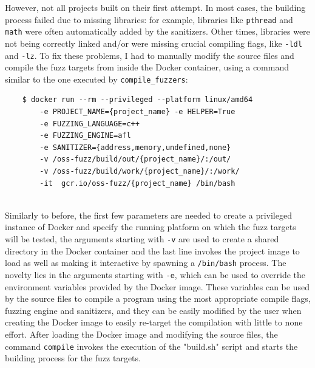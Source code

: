 \newpage
However, not all projects built on their first attempt.
\newline \newline
In most cases, the building process failed due to missing libraries: for example, libraries like \verb|pthread| and \verb|math| were often automatically added by the sanitizers.
\newline
Other times, libraries were not being correctly linked and/or were missing crucial compiling flags, like \verb|-ldl| and \verb|-lz|.
\newline \newline
To fix these problems, I had to manually modify the source files and compile the fuzz targets from inside the Docker container, using a command similar to the one executed by \verb|compile_fuzzers|:
\begin{verbatim}
    $ docker run --rm --privileged --platform linux/amd64 
        -e PROJECT_NAME={project_name} -e HELPER=True 
        -e FUZZING_LANGUAGE=c++ 
        -e FUZZING_ENGINE=afl 
        -e SANITIZER={address,memory,undefined,none} 
        -v /oss-fuzz/build/out/{project_name}/:/out/   
        -v /oss-fuzz/build/work/{project_name}/:/work/
        -it  gcr.io/oss-fuzz/{project_name} /bin/bash
\end{verbatim}
\ \\
Similarly to before, the first few parameters are needed to create a privileged instance of Docker and specify the running platform on which the fuzz targets will be tested, the arguments starting with \verb|-v| are used to create a shared directory in the Docker container and the last line invokes the project image to load as well as making it interactive by spawning a \verb|/bin/bash| process.
\newline \newline
The novelty lies in the arguments starting with \verb|-e|, which can be used to override the environment variables provided by the Docker image.
\newline
These variables can be used by the source files to compile a program using the most appropriate compile flags, fuzzing engine and sanitizers, and they can be easily modified by the user when creating the Docker image to easily re-target the compilation with little to none effort.
\newline \newline
After loading the Docker image and modifying the source files, the command \verb|compile| invokes the execution of the "build.sh" script and starts the building process for the fuzz targets.



